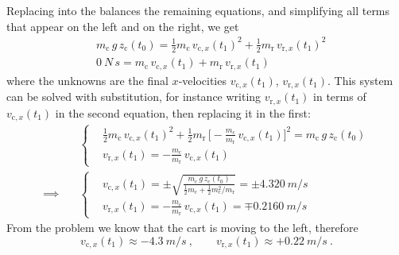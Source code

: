 \documentclass[a4paper,12pt,%
onecolumn,oneside,%
british%
]{memoir}
\renewcommand*{\|}[1][]{\nonscript\:#1\vert\nonscript\:\mathopen{}}
\newcommand*{\yti}{t_{0}}
\newcommand*{\ytf}{t_{1}}
\newcommand*{\ym}{m}%
\begin{document}
Replacing into the balances the remaining equations, and simplifying all terms that appear on the left and on the right, we get
\begin{equation*}
  \begin{aligned}
    &\ym_{\text{c}}\,g\,z_{\text{c}}(\yti)
    =
    \tfrac12 \ym_{\text{c}}\,v_{\text{c},x}(\ytf)^{2}
    + \tfrac12 \ym_{\text{r}}\,v_{\text{r},x}(\ytf)^{2}
    \\[1ex]
    &\qty{0}{N\,s} = \ym_{\text{c}}\,v_{\text{c},x}(\ytf)
    +\ym_{\text{r}}\,v_{\text{r},x}(\ytf)
  \end{aligned}
\end{equation*}
where the unknowns are the final $x$-velocities $v_{\text{c},x}(\ytf)$, $v_{\text{r},x}(\ytf)$. This system can be solved with substitution, for instance writing $v_{\text{r},x}(\ytf)$ in terms of $v_{\text{c},x}(\ytf)$ in the second equation, then replacing it in the first:
\begin{equation*}
  \begin{aligned}
    &\left\{\begin{aligned}
      &\tfrac12 \ym_{\text{c}}\,v_{\text{c},x}(\ytf)^{2}
      + \tfrac12 \ym_{\text{r}}\,
      \biggl[
      -\frac{\ym_{\text{c}}}{\ym_{\text{r}}}\,v_{\text{c},x}(\ytf)
      \biggr]^{2}
      = \ym_{\text{c}}\,g\,z_{\text{c}}(\yti)
      \\[1ex]
      &v_{\text{r},x}(\ytf) =
      -\frac{\ym_{\text{c}}}{\ym_{\text{r}}}\,v_{\text{c},x}(\ytf)
    \end{aligned}\right.
      \\
      \implies\quad
    &\left\{\begin{aligned}
    & v_{\text{c},x}(\ytf) =
    \pm \sqrt{\frac{
        \ym_{\text{c}}\,g\,z_{\text{c}}(\yti)
      }{
        \tfrac12 \ym_{\text{c}} + \tfrac12 \ym_{\text{c}}^{2} / \ym_{\text{r}}
      }}
    = \pm \qty{4.320}{m/s}
      \\[1ex]
      &v_{\text{r},x}(\ytf) =
      -\frac{\ym_{\text{c}}}{\ym_{\text{r}}}\,v_{\text{c},x}(\ytf)
      = \mp \qty{0.2160}{m/s}
    \end{aligned}\right.
  \end{aligned}
\end{equation*}
From the problem we know that the cart is moving to the left, therefore
\begin{equation*}
  v_{\text{c},x}(\ytf) \approx -\qty{4.3}{m/s} \ ,
  \qquad
  v_{\text{r},x}(\ytf) \approx +\qty{0.22}{m/s} \ .
\end{equation*}
\end{document}
